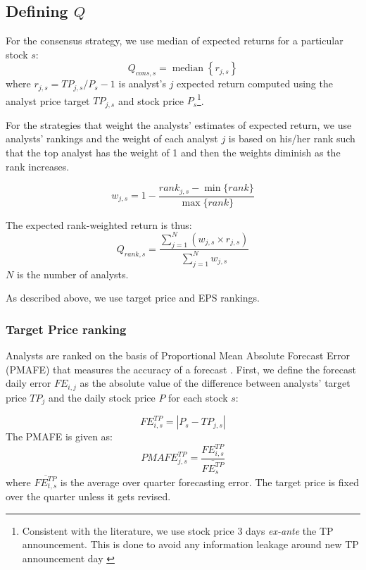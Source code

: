 \documentclass{article}
\DeclareMathOperator*{\median}{median}
\begin{document}
\subsection{Defining $Q$}
\label{def-q}

For the consensus strategy, we use median of expected returns for a particular stock $s$:
\begin{equation}
\label{consq}
Q_{cons,s}= \median \left\{r_{j,s}\right\}
\end{equation}
where $r_{j,s}=TP_{j,s}/P_{s}-1$  is analyst's $j$ expected return computed using the analyst price target $TP_{j,s}$ and stock price $P_{s}$\footnote{Consistent with the literature, we use stock price 3 days \emph{ex-ante} the TP announcement. This is done to avoid any information leakage around new TP announcement day \citep{bonini2010}}. 

For the strategies that weight the analysts' estimates of expected return, we use analysts' rankings and the weight of each analyst $j$ is based on his/her rank such that the top analyst has the weight of 1 and then the weights diminish as the rank increases.


\begin{equation}
\label{eq:weight}
w_{j,s}=1-\frac{rank_{j,s}-\min{ \{rank \} }}{\max{\{rank \}}}
\end{equation}

The expected rank-weighted return is thus:
\begin{equation}
\label{rankq}
Q_{rank,s}=\frac{\sum_{j=1}^{N} (w_{j,s} \times r_{j,s})}{\sum_{j=1}^{N} w_{j,s}}
\end{equation}
$N$ is the number of analysts.

As described above, we use target price and EPS rankings.

\subsubsection{Target Price ranking} 

Analysts are ranked on the basis of Proportional Mean Absolute Forecast Error (PMAFE) that measures the accuracy of a forecast  \citep{clement1999,brown2001,ertimur2007}. First,  we define the forecast daily error  $FE_{i,j}$ as the absolute value of the difference between analysts' target price $TP_{j}$ and the daily stock price $P$ for each stock $s$:

\begin{equation}
\label{dfe}
FE_{i,s}^{TP}=|{P_{s}-TP_{j,s}}|
\end{equation}
The PMAFE is given as:
\begin{equation}
\label{tp:pmafe}
PMAFE_{j,s}^{TP}=\frac{FE_{i,s}^{TP}}{\overline{FE_{s}^{TP}}}
\end{equation}
where $\overline{{FE}_{t,s}^{TP}}$ is the average over quarter forecasting error. The target price is fixed over the quarter unless it gets revised.
\end{document}
